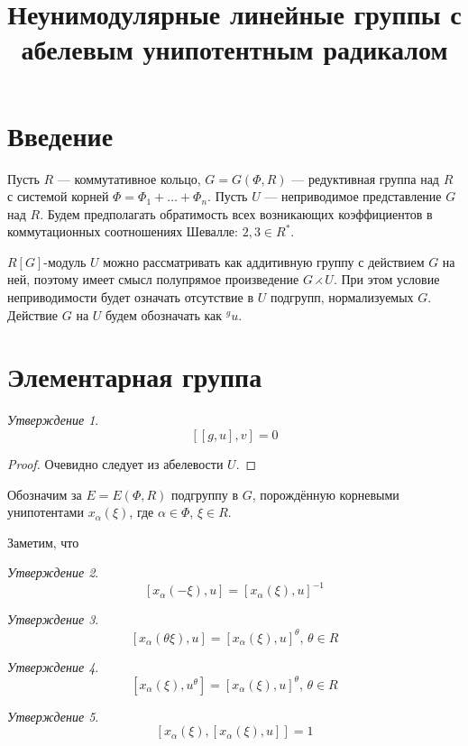 \documentclass[15pt]{article}
\title{Неунимодулярные линейные группы с абелевым унипотентным радикалом}
\author{}
\date{}
\theoremstyle{remark}
\newtheorem{prop}{Утверждение}
\begin{document}
\maketitle

\sloppy

\section{Введение}

Пусть $R$ --- коммутативное кольцо, $G = G(\Phi, R)$ --- редуктивная группа над $R$ с системой корней $\Phi = \Phi_1 + \dots + \Phi_n$. Пусть $U$ --- неприводимое представление $G$ над $R$. Будем предполагать обратимость всех возникающих коэффициентов в коммутационных соотношениях Шевалле: $2,3 \in R^* $. %

$R[G]$-модуль $U$ можно рассматривать как аддитивную группу с действием $G$ на ней, поэтому имеет смысл полупрямое произведение $G \rightthreetimes U$. При этом условие неприводимости будет означать отсутствие в $U$ подгрупп, нормализуемых $G$. Действие $G$ на $U$ будем обозначать как $^{g}u$.

\section{Элементарная группа}

\begin{prop}
  $$[[g,u],v] = 0$$
\end{prop}
\begin{proof}
  Очевидно следует из абелевости $U$.
\end{proof}

Обозначим за $E = E(\Phi,R)$ подгруппу в $G$, порождённую корневыми унипотентами $x_\alpha(\xi)$, где $\alpha \in \Phi$, $\xi \in R$.

Заметим, что
\begin{prop}
  $$[x_\alpha(-\xi),u] = [x_\alpha(\xi),u]^{-1}$$
\end{prop}
\begin{prop}
  $$[x_\alpha(\theta\xi),u] = [x_\alpha(\xi),u]^\theta, \, \theta \in R$$
\end{prop}
\begin{prop}
  $$[x_\alpha(\xi),u^\theta] = [x_\alpha(\xi),u]^\theta, \, \theta \in R$$
\end{prop}
\begin{prop}
  $$[x_\alpha(\xi),[x_\alpha(\xi),u]] = 1$$
\end{prop}
\end{document}
